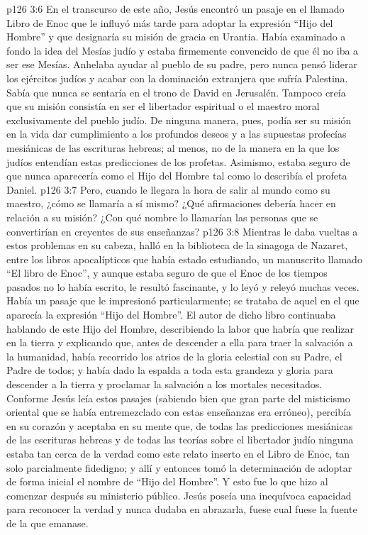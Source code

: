 \vs p126 3:6 \pc En el transcurso de este año, Jesús encontró un pasaje en el llamado Libro de Enoc que le influyó más tarde para adoptar la expresión “Hijo del Hombre” y que designaría su misión de gracia en Urantia. Había examinado a fondo la idea del Mesías judío y estaba firmemente convencido de que él no iba a ser ese Mesías. Anhelaba ayudar al pueblo de su padre, pero nunca pensó liderar los ejércitos judíos y acabar con la dominación extranjera que sufría Palestina. Sabía que nunca se sentaría en el trono de David en Jerusalén. Tampoco creía que su misión consistía en ser el libertador espiritual o el maestro moral exclusivamente del pueblo judío. De ninguna manera, pues, podía ser su misión en la vida dar cumplimiento a los profundos deseos y a las supuestas profecías mesiánicas de las escrituras hebreas; al menos, no de la manera en la que los judíos entendían estas predicciones de los profetas. Asimismo, estaba seguro de que nunca aparecería como el Hijo del Hombre tal como lo describía el profeta Daniel.
\vs p126 3:7 Pero, cuando le llegara la hora de salir al mundo como su maestro, ¿cómo se llamaría a sí mismo? ¿Qué afirmaciones debería hacer en relación a su misión? ¿Con qué nombre lo llamarían las personas que se convertirían en creyentes de sus enseñanzas?
\vs p126 3:8 \pc Mientras le daba vueltas a estos problemas en su cabeza, halló en la biblioteca de la sinagoga de Nazaret, entre los libros apocalípticos que había estado estudiando, un manuscrito llamado “El libro de Enoc”, y aunque estaba seguro de que el Enoc de los tiempos pasados no lo había escrito, le resultó fascinante, y lo leyó y releyó muchas veces. Había un pasaje que le impresionó particularmente; se trataba de aquel en el que aparecía la expresión “Hijo del Hombre”. El autor de dicho libro continuaba hablando de este Hijo del Hombre, describiendo la labor que habría que realizar en la tierra y explicando que, antes de descender a ella para traer la salvación a la humanidad, había recorrido los atrios de la gloria celestial con su Padre, el Padre de todos; y había dado la espalda a toda esta grandeza y gloria para descender a la tierra y proclamar la salvación a los mortales necesitados. Conforme Jesús leía estos pasajes (sabiendo bien que gran parte del misticismo oriental que se había entremezclado con estas enseñanzas era erróneo), percibía en su corazón y aceptaba en su mente que, de todas las predicciones mesiánicas de las escrituras hebreas y de todas las teorías sobre el libertador judío ninguna estaba tan cerca de la verdad como este relato inserto en el Libro de Enoc, tan solo parcialmente fidedigno; y allí y entonces tomó la determinación de adoptar de forma inicial el nombre de “Hijo del Hombre”. Y esto fue lo que hizo al comenzar después su ministerio público. Jesús poseía una inequívoca capacidad para reconocer la verdad y nunca dudaba en abrazarla, fuese cual fuese la fuente de la que emanase.
